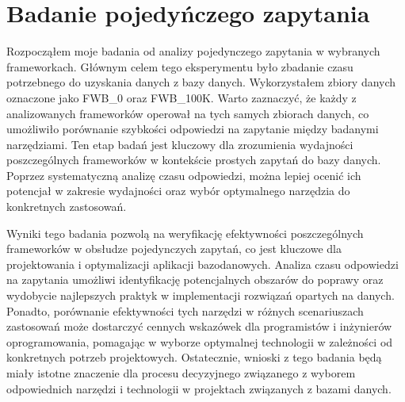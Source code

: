 \section{Badanie pojedyńczego zapytania}

Rozpocząłem moje badania od analizy pojedynczego zapytania w wybranych frameworkach.
Głównym celem tego eksperymentu było zbadanie czasu potrzebnego do uzyskania danych z bazy danych.
Wykorzystałem zbiory danych oznaczone jako FWB\_0 oraz FWB\_100K.
Warto zaznaczyć, że każdy z analizowanych frameworków operował na tych samych zbiorach danych, co umożliwiło porównanie szybkości odpowiedzi na zapytanie między badanymi narzędziami.
Ten etap badań jest kluczowy dla zrozumienia wydajności poszczególnych frameworków w kontekście prostych zapytań do bazy danych.
Poprzez systematyczną analizę czasu odpowiedzi, można lepiej ocenić ich potencjał w zakresie wydajności oraz wybór optymalnego narzędzia do konkretnych zastosowań.

Wyniki tego badania pozwolą na weryfikację efektywności poszczególnych frameworków w obsłudze pojedynczych zapytań, co jest kluczowe dla projektowania i optymalizacji aplikacji bazodanowych.
Analiza czasu odpowiedzi na zapytania umożliwi identyfikację potencjalnych obszarów do poprawy oraz wydobycie najlepszych praktyk w implementacji rozwiązań opartych na danych.
Ponadto, porównanie efektywności tych narzędzi w różnych scenariuszach zastosowań może dostarczyć cennych wskazówek dla programistów i inżynierów oprogramowania, pomagając w wyborze optymalnej technologii w zależności od konkretnych potrzeb projektowych.
Ostatecznie, wnioski z tego badania będą miały istotne znaczenie dla procesu decyzyjnego związanego z wyborem odpowiednich narzędzi i technologii w projektach związanych z bazami danych.



